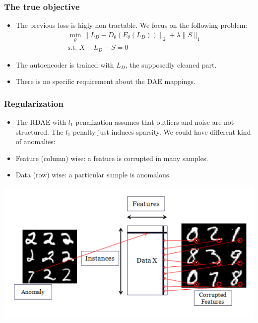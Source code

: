 \documentclass{beamer}
\theoremstyle{plain}
\theoremstyle{definition}
\theoremstyle{remark}
\newcommand{\norm}[1]{\lVert#1\rVert}
\begin{document}
	
\begin{frame}
	\frametitle{The true objective}
	\begin{itemize}
		\item The previous loss is higly non tractable. We focus on the following problem:
			\begin{align}
				\min_{\theta}{\norm{L_D -D_{\theta}(E_{\theta}(L_D))}_2 + \lambda\norm{S}_1}\\
				\text{s.t. }X-L_D-S=0  
			\end{align}
		\item The autoencoder is trained with $L_D$, the supposedly cleaned part.
		\item There is no specific requirement about the DAE mappings.
	\end{itemize}
\end{frame}

\begin{frame}
	\frametitle{Regularization}
	\begin{itemize}
		\item The RDAE with $l_1$ penalization assumes that outliers and noise are not structured. The $l_1$ penalty just induces sparsity. We could have different kind of anomalies:
		\item Feature (column) wise: a feature is corrupted in many samples.
		\item Data (row) wise: a particular sample is anomalous. 
	\end{itemize}
\end{frame}

\begin{frame}
	\centering
	\includegraphics[width=0.9\linewidth]{Images/diff_anomalies.png}
\end{frame}
\end{document}
